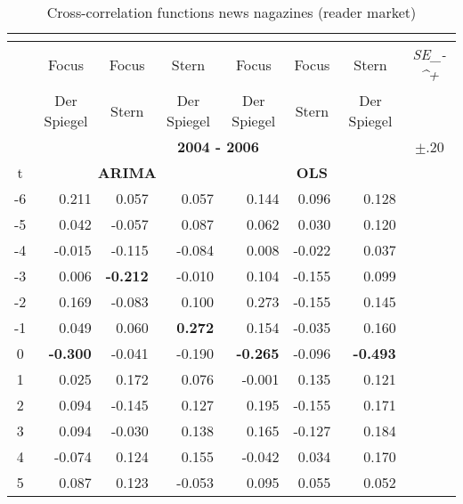 \documentclass[10pt,a4paper]{scrreprt}
\begin{document}
\begin{table}[htbp]
  \centering
  \caption{Cross-correlation functions news nagazines (reader market)}
       \begin{tabular}{crrr|rrrr}
    \textcolor[rgb]{ 1,  1,  1}{} & \textcolor[rgb]{ 1,  1,  1}{} & \textcolor[rgb]{ 1,  1,  1}{} & \multicolumn{1}{c}{\textcolor[rgb]{ 1,  1,  1}{}} & \textcolor[rgb]{ 1,  1,  1}{} & \textcolor[rgb]{ 1,  1,  1}{} & \textcolor[rgb]{ 1,  1,  1}{} & \textcolor[rgb]{ 1,  1,  1}{} \\
    \midrule
    \midrule
          & \multicolumn{1}{c}{Focus} & \multicolumn{1}{c}{Focus} & \multicolumn{1}{c}{Stern} & \multicolumn{1}{c}{Focus} & \multicolumn{1}{c}{Focus} & \multicolumn{1}{c}{Stern} & \multicolumn{1}{c}{\textit{SE_-^+}} \\
          & \multicolumn{1}{c}{Der Spiegel} & \multicolumn{1}{c}{Stern} & \multicolumn{1}{c}{Der Spiegel} & \multicolumn{1}{c}{Der Spiegel} & \multicolumn{1}{c}{Stern} & \multicolumn{1}{c}{Der Spiegel} &  \\
    \midrule
          & \multicolumn{6}{c}{\textbf{2004 - 2006}}      & \multicolumn{1}{c}{$\pm$.20} \\
    \midrule
    t     & \multicolumn{3}{c|}{\textbf{ARIMA}} & \multicolumn{3}{c}{\textbf{OLS}} &  \\
    -6    & 0.211 & 0.057 & 0.057 & 0.144 & 0.096 & 0.128 &  \\
    -5    & 0.042 & -0.057 & 0.087 & 0.062 & 0.030 & 0.120 &  \\
    -4    & -0.015 & -0.115 & -0.084 & 0.008 & -0.022 & 0.037 &  \\
    -3    & 0.006 & \textbf{-0.212} & -0.010 & 0.104 & -0.155 & 0.099 &  \\
    -2    & 0.169 & -0.083 & 0.100 & 0.273 & -0.155 & 0.145 &  \\
    -1    & 0.049 & 0.060 & \textbf{0.272} & 0.154 & -0.035 & 0.160 &  \\
    0     & \textbf{-0.300} & -0.041 & -0.190 & \textbf{-0.265} & -0.096 & \textbf{-0.493} &  \\
    1     & 0.025 & 0.172 & 0.076 & -0.001 & 0.135 & 0.121 &  \\
    2     & 0.094 & -0.145 & 0.127 & 0.195 & -0.155 & 0.171 &  \\
    3     & 0.094 & -0.030 & 0.138 & 0.165 & -0.127 & 0.184 &  \\
    4     & -0.074 & 0.124 & 0.155 & -0.042 & 0.034 & 0.170 &  \\
    5     & 0.087 & 0.123 & -0.053 & 0.095 & 0.055 & 0.052 &  \\

\end{tabular}
\end{table}
\end{document}
